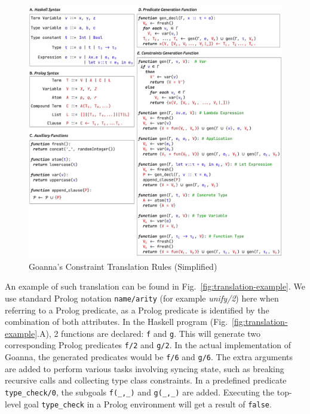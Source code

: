 \documentclass[pdflatex,lineno,sn-nature,Numbered]{sn-jnl}%
\begin{document}
    \begin{figure}[ht!]
        \centering
        \includegraphics[width=\linewidth,trim={0 0.5cm 0 0},clip]{images/Generation2}
        \caption{Goanna's Constraint Translation Rules (Simplified)} 
        \label{fig:translation}
    \end{figure}
    
  
    An example of such translation can be found in Fig.~\ref{fig:translation-example}. We use standard Prolog notation \texttt{name/arity} (for example {\it unify/2}) here when referring to a Prolog predicate, as a Prolog predicate is identified by the combination of both attributes. In the Haskell program (Fig.~\ref{fig:translation-example}.A), 2 functions are declared: \texttt{f} and \texttt{g}. This will generate two corresponding Prolog predicates \texttt{f/2} and \texttt{g/2}. In the actual implementation of Goanna, the generated predicates would be \texttt{f/6} and \texttt{g/6}. The extra arguments are added to perform various tasks involving syncing state, such as breaking recursive calls and collecting type class constraints. In a predefined predicate \texttt{type\_check/0}, the subgoals \texttt{f(\_,\_)} and \texttt{g(\_,\_)} are added. Executing the top-level goal \texttt{type\_check} in a Prolog environment will get a result of \texttt{false}.
    
\end{document}

